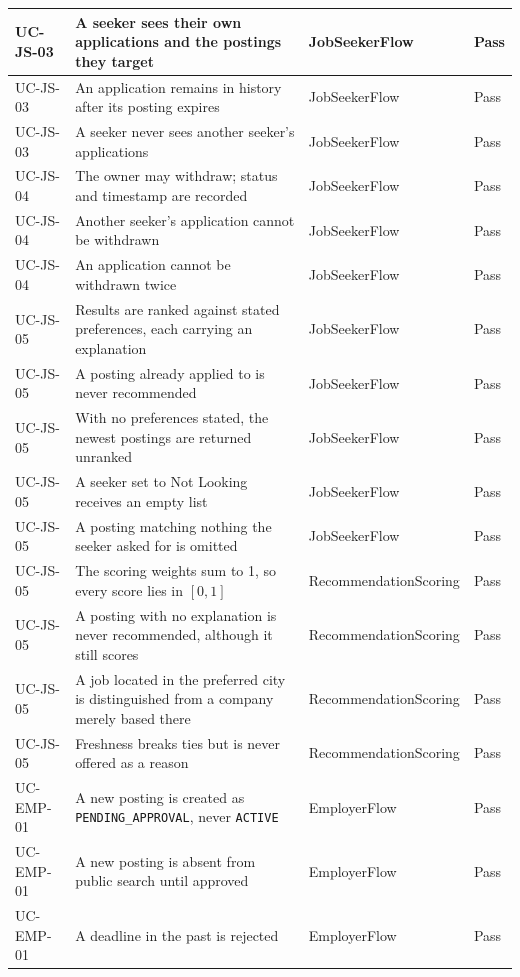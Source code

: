 \begin{longtable}{|>{\raggedright\arraybackslash}p{2.0cm}|>{\raggedright\arraybackslash}p{5.7cm}|>{\raggedright\arraybackslash}p{4.6cm}|>{\raggedright\arraybackslash}p{1.4cm}|}
	\hline
	UC-JS-03 & A seeker sees their own applications and the postings they target & JobSeekerFlow & Pass \\
	\hline
	UC-JS-03 & An application remains in history after its posting expires & JobSeekerFlow & Pass \\
	\hline
	UC-JS-03 & A seeker never sees another seeker's applications & JobSeekerFlow & Pass \\
	\hline
	UC-JS-04 & The owner may withdraw; status and timestamp are recorded & JobSeekerFlow & Pass \\
	\hline
	UC-JS-04 & Another seeker's application cannot be withdrawn & JobSeekerFlow & Pass \\
	\hline
	UC-JS-04 & An application cannot be withdrawn twice & JobSeekerFlow & Pass \\
	\hline
	UC-JS-05 & Results are ranked against stated preferences, each carrying an explanation & JobSeekerFlow & Pass \\
	\hline
	UC-JS-05 & A posting already applied to is never recommended & JobSeekerFlow & Pass \\
	\hline
	UC-JS-05 & With no preferences stated, the newest postings are returned unranked & JobSeekerFlow & Pass \\
	\hline
	UC-JS-05 & A seeker set to Not Looking receives an empty list & JobSeekerFlow & Pass \\
	\hline
	UC-JS-05 & A posting matching nothing the seeker asked for is omitted & JobSeekerFlow & Pass \\
	\hline
	UC-JS-05 & The scoring weights sum to 1, so every score lies in $[0,1]$ & Recommendation\-Scoring & Pass \\
	\hline
	UC-JS-05 & A posting with no explanation is never recommended, although it still scores & Recommendation\-Scoring & Pass \\
	\hline
	UC-JS-05 & A job located in the preferred city is distinguished from a company merely based there & Recommendation\-Scoring & Pass \\
	\hline
	UC-JS-05 & Freshness breaks ties but is never offered as a reason & Recommendation\-Scoring & Pass \\
	\hline
	UC-EMP-01 & A new posting is created as \texttt{PENDING\_APPROVAL}, never \texttt{ACTIVE} & EmployerFlow & Pass \\
	\hline
	UC-EMP-01 & A new posting is absent from public search until approved & EmployerFlow & Pass \\
	\hline
	UC-EMP-01 & A deadline in the past is rejected & EmployerFlow & Pass \\

\end{longtable}

